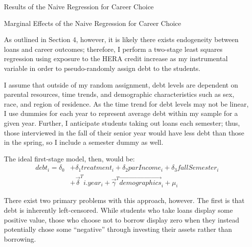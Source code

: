 \documentclass[12pt]{article}
\newcommand{\regs}{../Analysis/Regressions/Output/}
\begin{document}
	
	\begin{table}
		\centering
		\caption{Results of the Naive Regression for Career Choice}
		\resizebox{\textwidth}{!}{
			
		}
		\label{naive2}
	\end{table}

	\begin{table}
		\centering
		\caption{Marginal Effects of the Naive Regression for Career Choice}
		\resizebox{\textwidth}{!}{
			
		}
		\label{naive2marg}
	\end{table}
	
	As outlined in Section 4, however, it is likely there exists endogeneity between loans and career outcomes; therefore, I perform a two-stage least squares regression using exposure to the HERA credit increase as my instrumental variable in order to pseudo-randomly assign debt to the students. 
	
	I assume that outside of my random assignment, debt levels are dependent on parental resources, time trends, and demographic characteristics such as sex, race, and region of residence. As the time trend for debt levels may not be linear, I use dummies for each year to represent average debt within my sample for a given year. Further, I anticipate students taking out loans each semester; thus, those interviewed in the fall of their senior year would have less debt than those in the spring, so I include a semester dummy as well.
	
	The ideal first-stage model, then, would be: 
	\begin{equation}
	\begin{aligned}
	debt_i = \delta_0 &+ \delta_1 treatment_i + \delta_2 parIncome_i + \delta_3 fallSemester_i \\
	&+ \vec{\delta}^T i.year_i + \vec{\gamma}^T \vec{demographics}_i + \mu_i \label{fseq}
	\end{aligned}
	\end{equation}
	
	There exist two primary problems with this approach, however. The first is that debt is inherently left-censored. While students who take loans display some positive value, those who choose not to borrow display zero when they instead potentially chose some ``negative'' through investing their assets rather than borrowing. 
	
\end{document}
